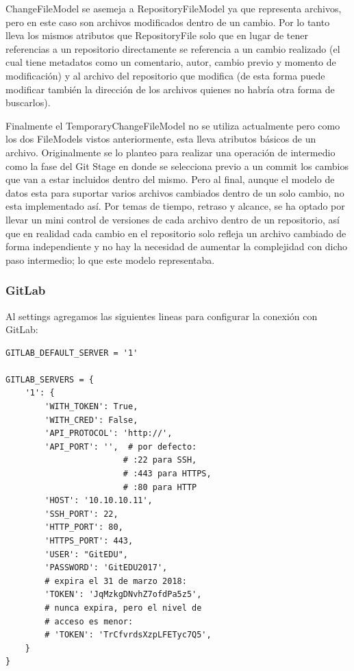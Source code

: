 ChangeFileModel se asemeja a RepositoryFileModel ya que representa archivos, pero en este caso son archivos modificados dentro de un cambio. Por lo tanto lleva los mismos atributos que RepositoryFile solo que en lugar de tener referencias a un repositorio directamente se referencia a un cambio realizado (el cual tiene metadatos como un comentario, autor, cambio previo y momento de modificación) y al archivo del repositorio que modifica (de esta forma puede modificar también la dirección de los archivos quienes no habría otra forma de buscarlos).

Finalmente el TemporaryChangeFileModel no se utiliza actualmente pero como los dos FileModels vistos anteriormente, esta lleva atributos básicos de un archivo. Originalmente se lo planteo para realizar una operación de intermedio como la fase del Git Stage en donde se selecciona previo a un commit los cambios que van a estar incluidos dentro del mismo. Pero al final, aunque el modelo de datos esta para suportar varios archivos cambiados dentro de un solo cambio, no esta implementado así. Por temas de tiempo, retraso y alcance, se ha optado por llevar un mini control de versiones de cada archivo dentro de un repositorio, así que en realidad cada cambio en el repositorio solo refleja un archivo cambiado de forma independiente y no hay la necesidad de aumentar la complejidad con dicho paso intermedio; lo que este modelo representaba. 

\subsubsection{GitLab}
Al settings agregamos las siguientes lineas para configurar la conexión con GitLab:
\lstset{language=Python}
\begin{lstlisting}
GITLAB_DEFAULT_SERVER = '1'

GITLAB_SERVERS = {
    '1': {
        'WITH_TOKEN': True,
        'WITH_CRED': False,
        'API_PROTOCOL': 'http://',
        'API_PORT': '',  # por defecto:
                        # :22 para SSH,
                        # :443 para HTTPS,
                        # :80 para HTTP
        'HOST': '10.10.10.11',
        'SSH_PORT': 22,
        'HTTP_PORT': 80,
        'HTTPS_PORT': 443,
        'USER': "GitEDU",
        'PASSWORD': 'GitEDU2017',
        # expira el 31 de marzo 2018:
        'TOKEN': 'JqMzkgDNvhZ7ofdPa5z5',
        # nunca expira, pero el nivel de 
        # acceso es menor:
        # 'TOKEN': 'TrCfvrdsXzpLFETyc7Q5',  
    }
}
\end{lstlisting}
\lstset{language=Bash}

